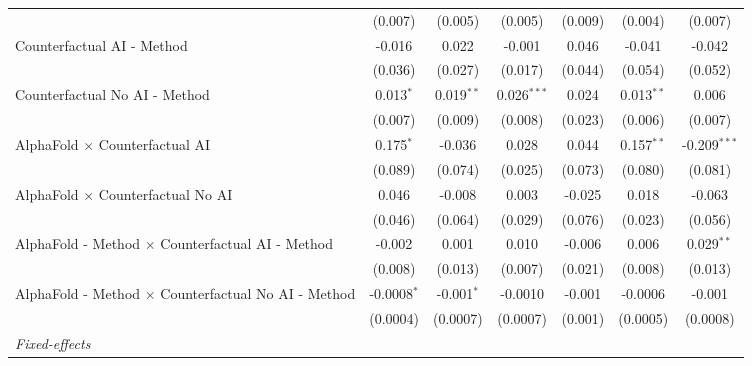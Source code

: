 \begin{tabular}{lcccccc}
                                                              & (0.007)       & (0.005)      & (0.005)       & (0.009)       & (0.004)       & (0.007)\\   
   Counterfactual AI - Method                                 & -0.016        & 0.022        & -0.001        & 0.046         & -0.041        & -0.042\\   
                                                              & (0.036)       & (0.027)      & (0.017)       & (0.044)       & (0.054)       & (0.052)\\   
   Counterfactual No AI - Method                              & 0.013$^{*}$   & 0.019$^{**}$ & 0.026$^{***}$ & 0.024         & 0.013$^{**}$  & 0.006\\   
                                                              & (0.007)       & (0.009)      & (0.008)       & (0.023)       & (0.006)       & (0.007)\\   
   AlphaFold $\times$ Counterfactual AI                       & 0.175$^{*}$   & -0.036       & 0.028         & 0.044         & 0.157$^{**}$  & -0.209$^{***}$\\   
                                                              & (0.089)       & (0.074)      & (0.025)       & (0.073)       & (0.080)       & (0.081)\\   
   AlphaFold $\times$ Counterfactual No AI                    & 0.046         & -0.008       & 0.003         & -0.025        & 0.018         & -0.063\\   
                                                              & (0.046)       & (0.064)      & (0.029)       & (0.076)       & (0.023)       & (0.056)\\   
   AlphaFold - Method $\times$ Counterfactual AI - Method     & -0.002        & 0.001        & 0.010         & -0.006        & 0.006         & 0.029$^{**}$\\   
                                                              & (0.008)       & (0.013)      & (0.007)       & (0.021)       & (0.008)       & (0.013)\\   
   AlphaFold - Method $\times$ Counterfactual No AI - Method  & -0.0008$^{*}$ & -0.001$^{*}$ & -0.0010       & -0.001        & -0.0006       & -0.001\\   
                                                              & (0.0004)      & (0.0007)     & (0.0007)      & (0.001)       & (0.0005)      & (0.0008)\\   
   \midrule
   \emph{Fixed-effects}\\

\end{tabular}
